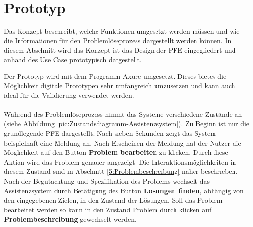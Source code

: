 \chapter{Prototyp}
\label{Prototyp}
Das Konzept beschreibt, welche Funktionen umgesetzt werden müssen und wie die Informationen für den Problemlöseprozess dargestellt werden können. In diesem Abschnitt wird das Konzept ist das Design der PFE eingegliedert und anhand des Use Case prototypisch dargestellt.

Der Prototyp wird mit dem Programm Axure  umgesetzt. Dieses bietet die Möglichkeit digitale Prototypen sehr umfangreich umzusetzen und kann auch ideal für die Validierung verwendet werden.
\\ \\
Während des Problemlöseprozess nimmt das Systeme verschiedene Zustände an (siehe Abbildung \ref{pic:Zustandsdiagramm-Assistenzsystem}). Zu Beginn ist nur die grundlegende PFE dargestellt. Nach sieben Sekunden zeigt das System beispielhaft eine Meldung an. Nach Erscheinen der Meldung hat der Nutzer die Möglichkeit auf den Button \textbf{Problem bearbeiten} zu klicken. Durch diese Aktion wird das Problem genauer angezeigt. Die Interaktionsmöglichkeiten in diesem Zustand sind in Abschnitt \ref{5:Problembeschreibung}  näher beschrieben. Nach der Begutachtung und Spezifikation des Problems wechselt das Assistenzsystem durch Betätigung des Button\textbf{ Lösungen finden}, abhängig von den eingegebenen Zielen, in den Zustand der Lösungen. Soll das Problem bearbeitet werden so kann in den Zustand Problem durch klicken auf \textbf{Problembeschreibung} gewechselt werden. 

